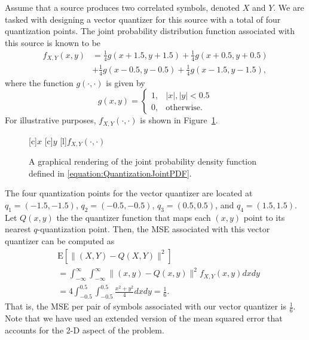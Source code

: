 \begin{example} \label{example:VectorQuantization}
Assume that a source produces two correlated symbols, denoted $X$ and $Y$.
We are tasked with designing a vector quantizer for this source with a total of four quantization points.
The joint probability distribution function associated with this source is known to be
\begin{equation} \label{equation:QuantizationJointPDF}
\begin{split}
f_{X,Y} (x, y) &= \frac{1}{4} g ( x + 1.5, y + 1.5 )
+ \frac{1}{4} g ( x + 0.5, y + 0.5 ) \\
&+ \frac{1}{4} g ( x - 0.5, y - 0.5 )
+ \frac{1}{4} g ( x - 1.5, y - 1.5 ) ,
\end{split}
\end{equation}
where the function $g(\cdot, \cdot)$ is given by
\begin{equation*}
g(x, y) = \begin{cases} 1, &  |x|, |y| < 0.5 \\
0, & \text{otherwise}. \end{cases}
\end{equation*}
For illustrative purposes, $f_{X,Y} (\cdot, \cdot)$ is shown in Figure~\ref{figure:VectorQuantization}.
\begin{figure}[htbp]
\begin{center}
\begin{psfrags}
[c]{$x$}
[c]{$y$}
[l]{$f_{X,Y}(\cdot, \cdot)$}
\end{psfrags}
\caption{A graphical rendering of the joint probability density function defined in \eqref{equation:QuantizationJointPDF}.}
\label{figure:VectorQuantization}
\end{center}
\end{figure}
The four quantization points for the vector quantizer are located at $q_1 = (-1.5, -1.5)$, $q_2 = (-0.5, -0.5)$, $q_3 = (0.5, 0.5)$, and $q_4 = (1.5, 1.5)$.
Let $Q(x,y)$ the the quantizer function that maps each $(x,y)$ point to its nearest $q$-quantization point.
Then, the MSE associated with this vector quantizer can be computed as
\begin{equation*}
\begin{split}
&\mathrm{E} \left[ \| (X,Y) - Q(X,Y) \|^2 \right] \\
&= \int_{-\infty}^{\infty} \int_{-\infty}^{\infty}
\| (x, y) - Q(x, y) \|^2 f_{X,Y}(x,y) dx dy \\
&= 4 \int_{-0.5}^{0.5} \int_{-0.5}^{0.5} \frac{x^2 + y^2}{4} dx dy
= \frac{1}{6} .
\end{split}
\end{equation*}
That is, the MSE per pair of symbols associated with our vector quantizer is $\frac{1}{6}$.
Note that we have used an extended version of the mean squared error that accounts for the 2-D aspect of the problem.


\end{example}
